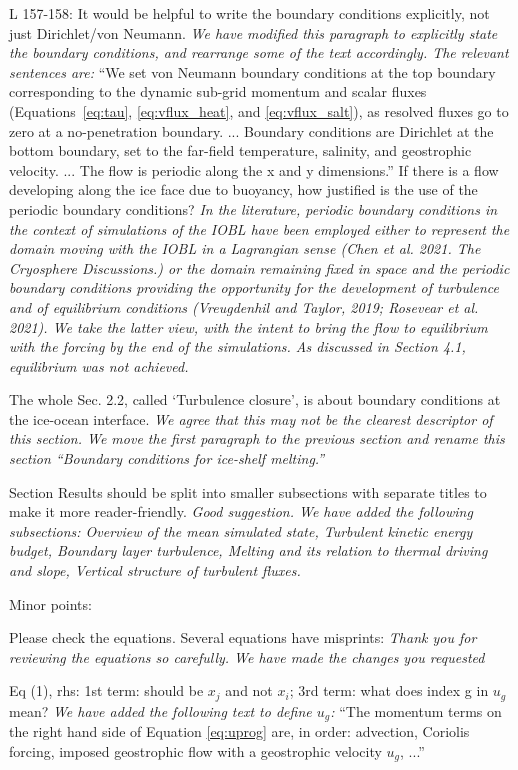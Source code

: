 \documentclass[tc, manuscript]{copernicus}
\begin{document}
L 157-158: It would be helpful to write the boundary conditions explicitly, not just Dirichlet/von Neumann. 
\textit{We have modified this paragraph to explicitly state the boundary conditions, and rearrange some of the text accordingly. The relevant sentences are:}
``We set von Neumann boundary conditions at the top boundary corresponding to the dynamic sub-grid momentum and scalar fluxes (Equations~\ref{eq:tau}, \ref{eq:vflux_heat}, and \ref{eq:vflux_salt}), as resolved fluxes go to zero at a no-penetration boundary. ... Boundary conditions are Dirichlet at the bottom boundary, set to the far-field temperature, salinity, and geostrophic velocity. ... The flow is periodic along the x and y dimensions.''
If there is a flow developing along the ice face due to buoyancy, how justified is the use of the periodic boundary conditions?
\textit{In the literature, periodic boundary conditions in the context of simulations of the IOBL have been employed either to represent the domain moving with the IOBL in a Lagrangian sense (Chen et al. 2021. The Cryosphere Discussions.) or the domain remaining fixed in space and the periodic boundary conditions providing the opportunity for the development of turbulence and of equilibrium conditions (Vreugdenhil and Taylor, 2019; Rosevear et al. 2021). We take the latter view, with the intent to bring the flow to equilibrium with the forcing by the end of the simulations. As discussed in Section 4.1, equilibrium was not achieved. }

The whole Sec. 2.2, called ‘Turbulence closure’, is about boundary conditions at the ice-ocean interface.
\textit{We agree that this may not be the clearest descriptor of this section. We move the first paragraph to the previous section and rename this section ``Boundary conditions for ice-shelf melting.''}

Section Results should be split into smaller subsections with separate titles to make it more reader-friendly.
\textit{Good suggestion. We have added the following subsections: Overview of the mean simulated state, Turbulent kinetic energy budget, Boundary layer turbulence, Melting and its relation to thermal driving and slope, Vertical structure of turbulent fluxes.}


Minor points:

Please check the equations. Several equations have misprints:
\textit{Thank you for reviewing the equations so carefully. We have made the changes you requested}

Eq (1), rhs: 1st term: should be $x_j$ and not $x_i$; 3rd term: what does index g in $u_g$ mean?
\textit{We have added the following text to define $u_g$:}
``The momentum terms on the right hand side of Equation \ref{eq:uprog} are, in order: advection, Coriolis forcing, imposed geostrophic flow with a geostrophic velocity $u_g$, ...''
\end{document}
